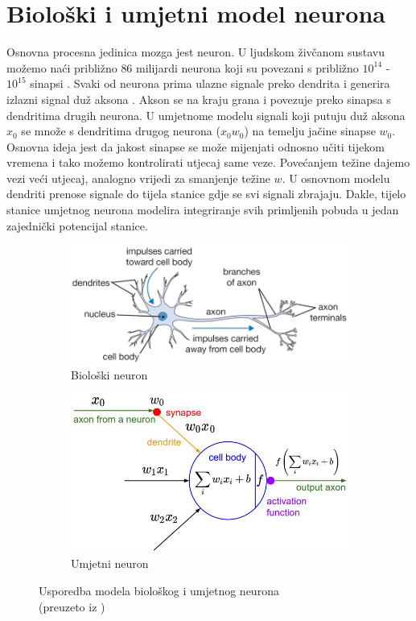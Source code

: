 \documentclass[times, utf8, diplomski]{fer}
\theoremstyle{definition}
\begin{document}
\section{Biološki i umjetni model neurona}
Osnovna procesna jedinica mozga jest neuron. U ljudskom živčanom sustavu možemo naći približno $86$ milijardi neurona koji su povezani s približno $10^{14}$ - $10^{15}$ sinapsi . Svaki od neurona prima ulazne signale preko dendrita  i generira izlazni signal duž aksona . Akson se na kraju grana i povezuje preko sinapsa s dendritima drugih neurona. U umjetnome modelu signali koji putuju duž aksona $x_0$ se množe s dendritima drugog neurona ($x_0w_0$) na temelju jačine sinapse $w_0$. Osnovna ideja jest da jakost sinapse se može mijenjati odnosno učiti tijekom vremena i tako možemo kontrolirati utjecaj same veze. Povećanjem težine dajemo vezi veći utjecaj, analogno vrijedi za smanjenje težine $w$. U osnovnom modelu dendriti prenose signale do tijela stanice gdje se svi signali zbrajaju. Dakle, tijelo stanice umjetnog neurona modelira integriranje svih primljenih pobuda u jedan zajednički potencijal stanice.
\begin{figure}[h]
\centering
\begin{subfigure}{.5\textwidth}
\centering
\includegraphics[width=\linewidth]{neuron.png}
\caption{Biološki neuron}
\label{fig:sub1}
\end{subfigure}%
\begin{subfigure}{.5\textwidth}
\centering
\includegraphics[width=\linewidth]{neuron_model.jpeg}
\caption{Umjetni neuron}
\label{fig:umjetni}
\end{subfigure}
\caption{Usporedba modela biološkog i umjetnog neurona \\ (preuzeto iz \cite{karpathy})}
\label{fig:usporedba_modela}
\end{figure}
\end{document}
